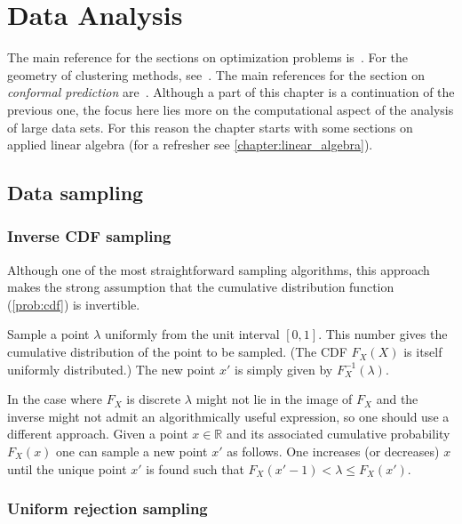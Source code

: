 \chapter{Data Analysis}

    The main reference for the sections on optimization problems is~\citet{shewchuk_introduction_1994}. For the geometry of clustering methods, see~\citet{boissonnat_bregman_2010}. The main references for the section on \textit{conformal prediction} are~\citet{shafer_tutorial_2008,vovk_algorithmic_2005}. Although a part of this chapter is a continuation of the previous one, the focus here lies more on the computational aspect of the analysis of large data sets. For this reason the chapter starts with some sections on applied linear algebra (for a refresher see \cref{chapter:linear_algebra}).

\section{Data sampling}
\subsection{Inverse CDF sampling}

    Although one of the most straightforward sampling algorithms, this approach makes the strong assumption that the cumulative distribution function (\cref{prob:cdf}) is invertible.

    \begin{method}
        Sample a point $\lambda$ uniformly from the unit interval $[0,1]$. This number gives the cumulative distribution of the point to be sampled. (The CDF $F_X(X)$ is itself uniformly distributed.) The new point $x'$ is simply given by $F^{-1}_X(\lambda)$.

        In the case where $F_X$ is discrete $\lambda$ might not lie in the image of $F_X$ and the inverse might not admit an algorithmically useful expression, so one should use a different approach. Given a point $x\in\mathbb{R}$ and its associated cumulative probability $F_X(x)$ one can sample a new point $x'$ as follows. One increases (or decreases) $x$ until the unique point $x'$ is found such that $F_X(x'-1)<\lambda\leq F_X(x')$.
    \end{method}

\subsection{Uniform rejection sampling}

